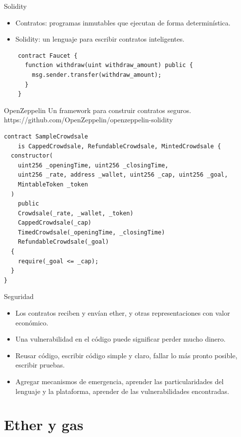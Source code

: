 \documentclass[10pt]{beamer}
\begin{document}
\begin{frame}[fragile]{Solidity}
  \begin{itemize}
    \item Contratos: programas inmutables que ejecutan de forma determinística.
    \item Solidity: un lenguaje para escribir contratos inteligentes.
  \end{itemize}
  \begin{verbatim}
    contract Faucet {
      function withdraw(uint withdraw_amount) public {
        msg.sender.transfer(withdraw_amount);
      }
    }
  \end{verbatim}
\end{frame}

\begin{frame}[fragile]{OpenZeppelin}
  Un framework para construir contratos seguros.
  \\ https://github.com/OpenZeppelin/openzeppelin-solidity
  \begin{verbatim}
contract SampleCrowdsale 
    is CappedCrowdsale, RefundableCrowdsale, MintedCrowdsale {
  constructor(
    uint256 _openingTime, uint256 _closingTime,
    uint256 _rate, address _wallet, uint256 _cap, uint256 _goal,
    MintableToken _token
  )
    public
    Crowdsale(_rate, _wallet, _token)
    CappedCrowdsale(_cap)
    TimedCrowdsale(_openingTime, _closingTime)
    RefundableCrowdsale(_goal)
  {
    require(_goal <= _cap);
  }
}
  \end{verbatim}
\end{frame}

\begin{frame}{Seguridad}
  \begin{itemize}
    \item Los contratos reciben y envían ether, y otras representaciones con valor económico.
    \item Una vulnerabilidad en el código puede significar perder mucho dinero.
    \item Reusar código, escribir código simple y claro, fallar lo más pronto posible, escribir pruebas.
    \item Agregar mecanismos de emergencia, aprender las particularidades del lenguaje y la plataforma, aprender de las vulnerabilidades encontradas.
  \end{itemize}
\end{frame}

\section{Ether y gas}
\end{document}
